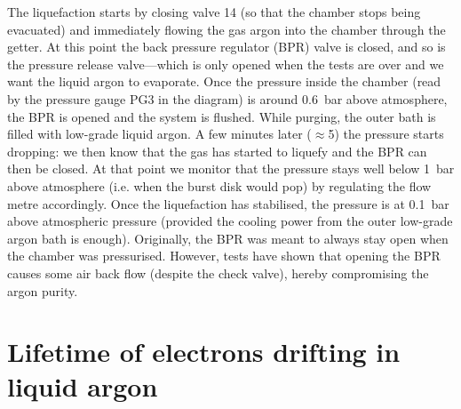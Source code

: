\documentclass[a4paper,11pt]{article}
\begin{document}
The liquefaction starts by closing valve 14 (so that the chamber stops being evacuated) and immediately flowing the gas argon into the chamber through the getter. At this point the back pressure regulator (BPR) valve is closed, and so is the pressure release valve---which is only opened when the tests are over and we want the liquid argon to evaporate. Once the pressure inside the chamber (read by the pressure gauge PG3 in the diagram) is around \SI{0.6}{bar} above atmosphere, the BPR is opened and the system is flushed. While purging, the outer bath is filled with low-grade liquid argon. A few minutes later ($\approx$5) the pressure starts dropping: we then know that the gas has started to liquefy and the BPR can then be closed. At that point we monitor that the pressure stays well below \SI{1}{bar} above atmosphere (i.e. when the burst disk would pop) by regulating the flow metre accordingly. Once the liquefaction has stabilised, the pressure is at \SI{0.1}{bar} above atmospheric pressure (provided the cooling power from the outer low-grade argon bath is enough). Originally, the BPR was meant to always stay open when the chamber was pressurised. However, tests have shown that opening the BPR causes some air back flow (despite the check valve), hereby compromising the argon purity.

\section{Lifetime of electrons drifting in liquid argon}

\end{document}

